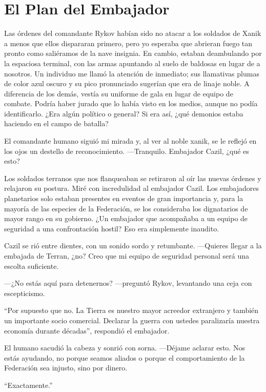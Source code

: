 \chapter{El Plan del Embajador}\label{sec:el-plan-del-embajador}

Las órdenes del comandante Rykov habían sido no atacar a los soldados de Xanik a menos que ellos dispararan primero, pero yo esperaba que abrieran fuego tan pronto como saliéramos de la nave insignia. En cambio, estaban deambulando por la espaciosa terminal, con las armas apuntando al suelo de baldosas en lugar de a nosotros. Un individuo me llamó la atención de inmediato; sus llamativas plumas de color azul oscuro y su pico pronunciado sugerían que era de linaje noble. A diferencia de los demás, vestía su uniforme de gala en lugar de equipo de combate. Podría haber jurado que lo había visto en los medios, aunque no podía identificarlo. ¿Era algún político o general? Si era así, ¿qué demonios estaba haciendo en el campo de batalla?

El comandante humano siguió mi mirada y, al ver al noble xanik, se le reflejó en los ojos un destello de reconocimiento. —Tranquilo. Embajador Cazil, ¿qué es esto?

Los soldados terranos que nos flanqueaban se retiraron al oír las nuevas órdenes y relajaron su postura. Miré con incredulidad al embajador Cazil. Los embajadores planetarios solo estaban presentes en eventos de gran importancia y, para la mayoría de las especies de la Federación, se los consideraba los dignatarios de mayor rango en su gobierno. ¿Un embajador que acompañaba a un equipo de seguridad a una confrontación hostil? Eso era simplemente inaudito.

Cazil se rió entre dientes, con un sonido sordo y retumbante. —Quieres llegar a la embajada de Terran, ¿no? Creo que mi equipo de seguridad personal será una escolta suficiente.

—¿No estás aquí para detenernos? —preguntó Rykov, levantando una ceja con escepticismo.

``Por supuesto que no. La Tierra es nuestro mayor acreedor extranjero y también un importante socio comercial. Declarar la guerra con ustedes paralizaría nuestra economía durante décadas'', respondió el embajador.

El humano sacudió la cabeza y sonrió con sorna. —Déjame aclarar esto. Nos estás ayudando, no porque seamos aliados o porque el comportamiento de la Federación sea injusto, sino por dinero.

``Exactamente.''


